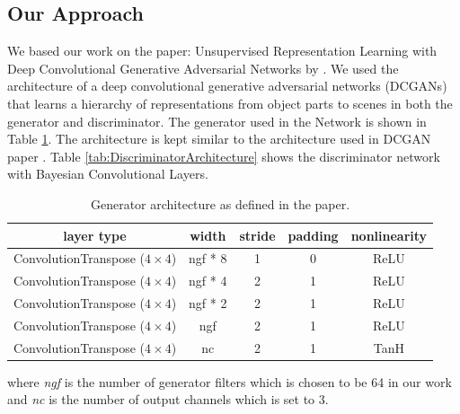 \subsection{Our Approach}

We based our work on the paper:  Unsupervised Representation Learning with Deep Convolutional Generative Adversarial Networks by  \citet{DBLP:journals/corr/RadfordMC15}. We used the architecture of a deep convolutional generative adversarial networks (DCGANs) that learns a hierarchy of representations from object parts to scenes in both the generator and discriminator.
The generator used in the Network is shown in Table \ref{tab:GeneratorArchitecture}. The architecture is kept similar to the architecture used in DCGAN paper \cite{DBLP:journals/corr/RadfordMC15}. Table \ref{tab:DiscriminatorArchitecture} shows the discriminator network with Bayesian Convolutional Layers. 

\begin{table}[H]
    \centering
    \renewcommand{\arraystretch}{2}
    \begin{tabular}{c c c c c} 
 \hline
 layer type & width & stride & padding & nonlinearity \\ [0.5ex] 
 \hline
 ConvolutionTranspose ($4\times4$) & ngf * 8 & 1 & 0  & ReLU \\ 
 

 ConvolutionTranspose ($4\times4$) & ngf * 4 & 2 & 1  & ReLU \\
 
 
 ConvolutionTranspose ($4\times4$) & ngf * 2 & 2 & 1 & ReLU \\
 
 ConvolutionTranspose ($4\times4$) & ngf & 2 & 1  & ReLU \\
 
 ConvolutionTranspose ($4\times4$) & nc & 2 & 1 & TanH \\ [1ex] 
 \hline
\end{tabular}
\renewcommand{\arraystretch}{1}
\caption{Generator architecture as defined in the paper. \cite{DBLP:journals/corr/RadfordMC15}}
\label{tab:GeneratorArchitecture}
\end{table}

where \textit{ngf} is the number of generator filters which is chosen to be 64 in our work and \textit{nc} is the number of output channels which is set to 3. 

